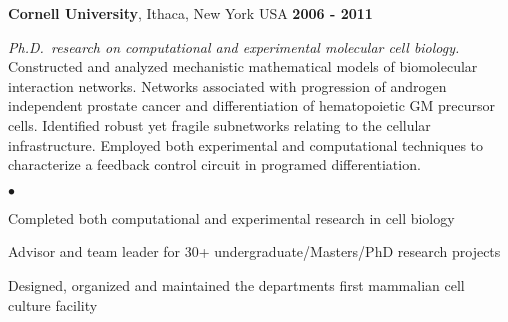 \documentclass[margin,line]{res}
\newenvironment{list2}{
  \begin{list}{$\bullet$}{%
      \setlength{\itemsep}{0in}
      \setlength{\parsep}{0in} \setlength{\parskip}{0in}
      \setlength{\topsep}{0in} \setlength{\partopsep}{0in} 
      \setlength{\leftmargin}{0.2in}}}{\end{list}}
\begin{document}
\begin{resume}
{\bf Cornell University}, Ithaca, New York USA \hfill {\bf 2006 - 2011}

{\em Ph.D.~research on computational and experimental molecular cell biology.}\\   
Constructed and analyzed mechanistic mathematical models of biomolecular interaction networks.
Networks associated with progression of androgen independent prostate cancer 
and differentiation of hematopoietic GM precursor cells. 
Identified robust yet fragile subnetworks relating to the cellular infrastructure.
Employed both experimental and computational techniques to characterize a feedback control circuit
in programed differentiation.
%
%
% 
\begin{list2}
\item Completed both computational and experimental research in cell biology
\item Advisor and team leader for 30+ undergraduate/Masters/PhD research projects
\item Designed, organized and maintained the departments first mammalian cell culture facility
\end{list2}

%


\end{resume}
\end{document}
